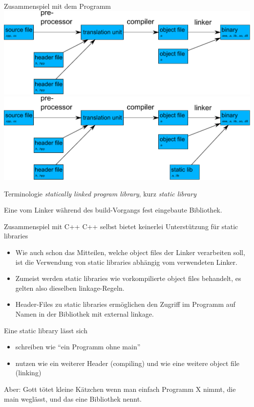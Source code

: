 \begin{frame}{Zusammenspiel mit dem Programm}
	\alt<1>
	{%
		\includegraphics[width=\textwidth]{images/translation}
	}{%
		\includegraphics[width=\textwidth]{images/translation-lib}
	}
	
	\vspace{2em}
	{
		\begin{block}{Terminologie}
			\emph{statically linked program library}, kurz \emph{static library}
			
			Eine vom Linker während des build-Vorgangs fest eingebaute Bibliothek.
		\end{block}
	}
\end{frame}

\begin{frame}{Zusammenspiel mit C++}
	\alert{ C++ selbst bietet keinerlei Unterstützung für static libraries }
	
	\uncover<+->
	
	\begin{itemize}[<+->]
		\item Wie auch schon das Mitteilen, welche object files der Linker verarbeiten soll, ist die Verwendung von static libraries abhängig vom verwendeten Linker.
		\item Zumeist werden static libraries wie vorkompilierte object files behandelt, es gelten also dieselben linkage-Regeln.
		\item Header-Files zu static libraries ermöglichen den Zugriff im Programm auf Namen in der Bibliothek mit external linkage.
	\end{itemize}
	
	\uncover<+->
	{
		Eine static library lässt sich
		\begin{itemize}
			\item schreiben wie \enquote{ein Programm ohne main}
			\item nutzen wie ein weiterer Header (compiling) und wie eine weitere object file (linking)
		\end{itemize}
	}
	
	\uncover<+->
	{
		\alert{ Aber: Gott tötet kleine Kätzchen wenn man einfach Programm X nimmt, die main weglässt, und das eine Bibliothek nennt. }
	}
\end{frame}

